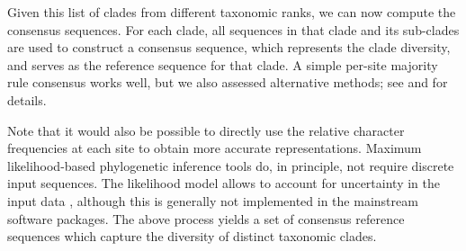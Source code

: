 Given this list of clades from different taxonomic ranks, we can now compute the consensus sequences.
For each clade, all sequences in that clade and its sub-clades are used to construct a consensus sequence,
which represents the clade diversity, and serves as the reference sequence for that clade.
A simple per-site majority rule consensus \cite{May1952,Day1992a} works well,
but we also assessed alternative methods;
see  and  for details.

Note that it would also be possible to directly use the relative character frequencies at each site
to obtain more accurate representations.
Maximum likelihood-based phylogenetic inference tools do, in principle, not require discrete input sequences.
The likelihood model allows to account for uncertainty in the input data \cite{Felsenstein2004},
although this is generally not implemented in the mainstream software packages.
The above process yields a set of consensus reference sequences which capture the diversity of distinct taxonomic clades.



